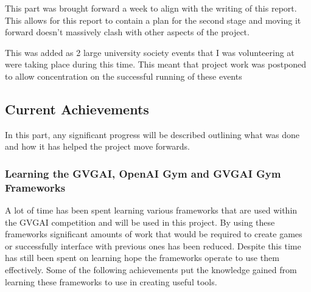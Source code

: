 \documentclass[a4paper]{article}
\begin{document}
\begin{description}
\setlength{\itemsep}{0pt}
\setlength{\parskip}{0pt}
\item [\large{Miscellaneous}]
\item [M4--Plan 2\textsuperscript{nd} Stage of the Project]
This part was brought forward a week to align with the writing of this report.
This allows for this report to contain a plan for the second stage and moving it forward doesn't massively clash with other aspects of the project.
\end{description}

\begin{description}
\setlength{\itemsep}{0pt}
\setlength{\parskip}{0pt}
\item [\large{Other Commitments}]
\item [C5--GameSoc Varsity \& HackNotts]
This was added as 2 large university society events that I was volunteering at were taking place during this time.
This meant that project work was postponed to allow concentration on the successful running of these events
\end{description}

\subsection{Current Achievements}
In this part, any significant progress will be described outlining what was done and how it has helped the project move forwards.

\subsubsection{Learning the GVGAI, OpenAI Gym and GVGAI Gym Frameworks}
A lot of time has been spent learning various frameworks that are used within the GVGAI competition and will be used in this project.
By using these frameworks significant amounts of work that would be required to create games or successfully interface with previous ones has been reduced.
Despite this time has still been spent on learning hope the frameworks operate to use them effectively.
Some of the following achievements put the knowledge gained from learning these frameworks to use in creating useful tools.
\end{document}
